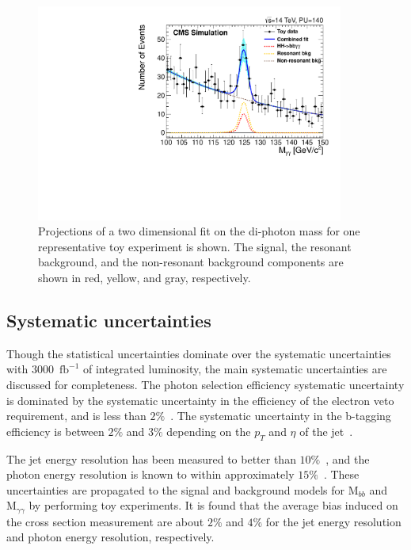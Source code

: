 \begin{figure}[h]
  \centering
  \includegraphics[width=0.9\textwidth]{figures_chapter6/hh_bbgg_mgg.pdf}
  \caption{Projections of a two dimensional fit on the di-photon mass for one representative
  toy experiment is shown. The signal, the resonant background, and the non-resonant background components are shown in 
  red, yellow, and gray, respectively.}
  \label{fig:twoDfullFitProjection}
\end{figure}


\subsection{Systematic uncertainties}

Though the statistical uncertainties dominate over the systematic uncertainties with $3000$~$\mathrm{fb}^{-1}$ of integrated luminosity, the main systematic uncertainties are discussed for completeness.
The photon selection efficiency systematic uncertainty is dominated by the systematic uncertainty in the efficiency of the electron veto requirement, and is 
less than $2\%$~\cite{CMS-DP-2013-010}. The systematic uncertainty in the b-tagging efficiency is between $2\%$ and $3\%$ depending on the $p_{T}$ and $\eta$ of the jet~\cite{CMS:BTagPaper,CMS-PAS-BTV-13-001}. 

The jet energy resolution has been measured to better than $10\%$~\cite{Chatrchyan:2011ds}, and the photon energy resolution is known to within approximately $15\%$~\cite{Chatrchyan:2013dga}. These uncertainties are propagated to the signal and background models for $\mathrm{M}_{bb}$ and $\mathrm{M}_{\gamma\gamma}$ by performing toy experiments. It is found that the average bias induced on the cross section measurement are about $2\%$ and $4\%$ for the jet energy resolution and photon energy resolution, respectively. 

